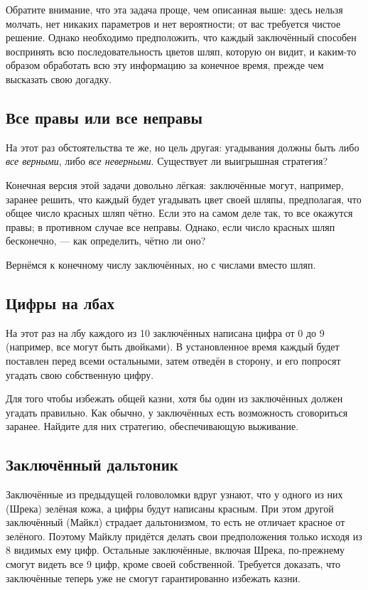 Обратите внимание, что эта задача проще, чем описанная выше:
здесь нельзя молчать, нет никаких параметров и нет вероятности;
от вас требуется чистое решение.
Однако необходимо предположить, что каждый заключённый способен воспринять всю последовательность цветов шляп, которую он видит, и каким-то образом обработать всю эту информацию за конечное время, прежде чем высказать свою догадку.


\subsection*{Все правы или все неправы}

На этот раз обстоятельства те же, но цель другая:
угадывания должны быть либо \emph{все верными}, либо \emph{все неверными}.
Существует ли выигрышная стратегия?

Конечная версия этой задачи довольно лёгкая:
заключённые могут, например, заранее решить, что каждый будет угадывать цвет своей шляпы, предполагая, что общее число красных шляп чётно.
Если это на самом деле так, то все окажутся правы;
в противном случае все неправы.
Однако, если число красных шляп бесконечно, --- как определить, чётно ли оно?

\medskip

Вернёмся к конечному числу заключённых, но с числами вместо шляп.

\subsection*{Цифры на лбах}

На этот раз на лбу каждого из 10 заключённых написана цифра от 0 до 9 (например, все могут быть двойками).
В установленное время каждый будет поставлен перед всеми остальными, затем отведён в сторону, и его попросят угадать свою собственную цифру.

Для того чтобы избежать общей казни, хотя бы один из заключённых должен угадать правильно.
Как обычно, у заключённых есть возможность сговориться заранее.
Найдите для них стратегию, обеспечивающую выживание.

\subsection*{Заключённый дальтоник}

Заключённые из предыдущей головоломки вдруг узнают, что у одного из них (Шрека) зелёная кожа, а цифры будут написаны красным.
При этом другой заключённый (Майкл) страдает дальтонизмом, то есть не отличает красное от зелёного.
Поэтому Майклу придётся делать свои предположения только исходя из 8 видимых ему цифр.
Остальные заключённые, включая Шрека, по-прежнему смогут видеть все 9 цифр, кроме своей собственной.
Требуется доказать, что заключённые теперь уже не смогут гарантированно избежать казни.

